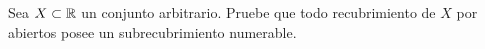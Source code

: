 
Sea $X\subset\mathbb{R}$ un conjunto arbitrario. Pruebe que todo recubrimiento de $X$ por abiertos posee un subrecubrimiento numerable.